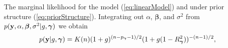 \documentclass[12pt]{article}
\def\vectorfontone{\bf}
\def\vectorfonttwo{\boldsymbol}
\def\vb{{\vectorfontone b}}                      %
\def\vx{{\vectorfontone x}}                      %
\def\vy{{\vectorfontone y}}                      %
\def\vone{{\vectorfontone 1}}
\def\vbeta{{\vectorfonttwo \beta}}               %
\def\vgamma{{\vectorfonttwo \gamma}}             %
\def\vmu{{\vectorfonttwo \mu}}                   %
\def\matrixfontone{\bf}
\def\matrixfonttwo{\boldsymbol}
\def\mA{{\matrixfontone A}}                      %
\def\mX{{\matrixfontone X}}                      %
\def\mSigma{{\matrixfonttwo \Sigma}}             %
\def\ds{\displaystyle}
\newcommand{\joc}[1]{{\color{red}#1}}
\begin{document}
The marginal likelihood for the
model  (\ref{eq:linearModel}) and under prior structure
(\ref{eq:priorStructure}). 
%
Integrating out $\alpha$, $\vbeta$, and $\sigma^2$ from $p(\vy,\alpha,\vbeta,\sigma^2|g,\vgamma)$ we
obtain
\begin{equation}\label{eq:yGivenG}
\begin{array}{rl}
\ds p(\vy|g,\vgamma)
\ds = K(n)
(1 + g)^{(n - p_\vgamma - 1)/2}(1 + g (1 - R_\vgamma^2))^{-(n-1)/2},
\end{array} 
\end{equation}
\end{document}
